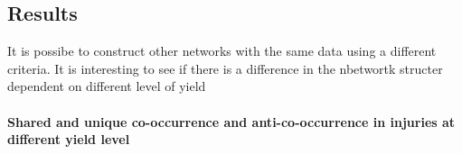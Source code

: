 \subsection{Results}

It is possibe to construct other networks with the same data using a different  criteria. It is interesting to see if there is a difference in the nbetwortk structer dependent on different level of yield

\paragraph{Shared and unique co-occurrence and anti-co-occurrence in injuries at different yield level}